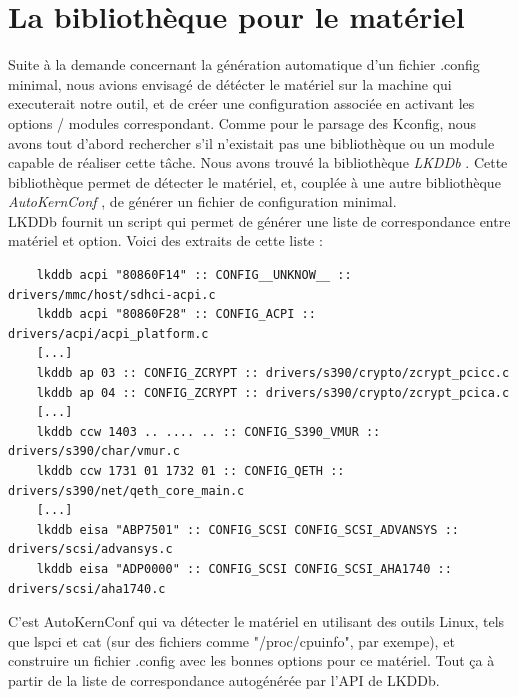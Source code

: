 \documentclass[16pts]{report}
\begin{document}
    \section{La bibliothèque pour le matériel}
    \label{sec:La bibliothèque pour le matériel}
    Suite à la demande concernant la génération automatique d'un fichier
    .config minimal, nous avions envisagé de détécter le matériel sur la
    machine qui executerait notre outil, et de créer une configuration associée
    en activant les options / modules correspondant. Comme pour le parsage des
    Kconfig, nous avons tout d'abord rechercher s'il n'existait pas une
    bibliothèque ou un module capable de réaliser cette tâche. Nous avons
    trouvé la bibliothèque \textit{LKDDb} \cite{Existant:lib:lkddb}. Cette
    bibliothèque permet de détecter le matériel, et, couplée à une autre
    bibliothèque \textit{AutoKernConf} \cite{Existant:lib:autoKernConf}, de
    générer un fichier de configuration minimal. \\

    LKDDb fournit un script qui permet de générer une liste de correspondance
    entre matériel et option. Voici des extraits de cette liste : \\

    \begin{verbatim}
    lkddb acpi "80860F14" :: CONFIG__UNKNOW__ :: drivers/mmc/host/sdhci-acpi.c
    lkddb acpi "80860F28" :: CONFIG_ACPI :: drivers/acpi/acpi_platform.c
    [...]
    lkddb ap 03 :: CONFIG_ZCRYPT :: drivers/s390/crypto/zcrypt_pcicc.c
    lkddb ap 04 :: CONFIG_ZCRYPT :: drivers/s390/crypto/zcrypt_pcica.c
    [...]
    lkddb ccw 1403 .. .... .. :: CONFIG_S390_VMUR :: drivers/s390/char/vmur.c
    lkddb ccw 1731 01 1732 01 :: CONFIG_QETH :: drivers/s390/net/qeth_core_main.c
    [...]
    lkddb eisa "ABP7501" :: CONFIG_SCSI CONFIG_SCSI_ADVANSYS :: drivers/scsi/advansys.c
    lkddb eisa "ADP0000" :: CONFIG_SCSI CONFIG_SCSI_AHA1740 :: drivers/scsi/aha1740.c
    \end{verbatim}

    C'est AutoKernConf qui va détecter le matériel en utilisant des outils
    Linux, tels que lspci et cat (sur des fichiers comme "/proc/cpuinfo", par
    exempe), et construire un fichier .config avec les bonnes options pour ce
    matériel. Tout ça à partir de la liste de correspondance autogénérée par
    l'API de LKDDb. \\
\end{document}
